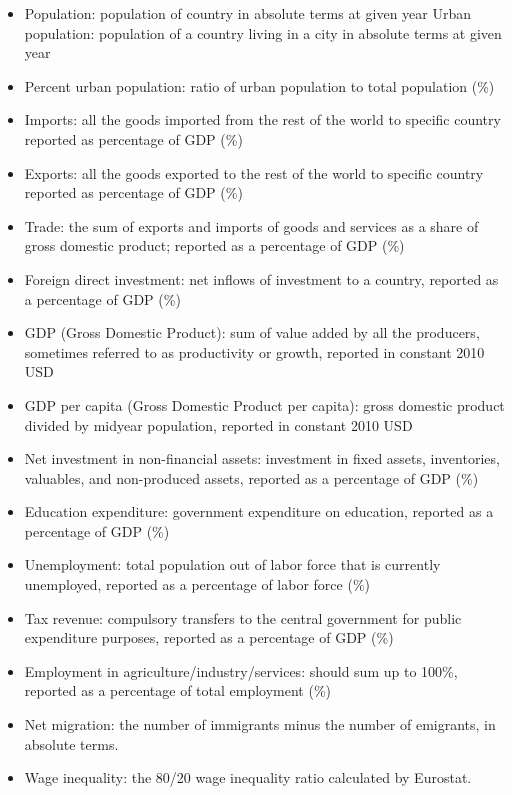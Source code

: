 \documentclass[
]{article}
\begin{document}
\begin{itemize}
\item
  Population: population of country in absolute terms at given year
  Urban population: population of a country living in a city in absolute
  terms at given year
\item
  Percent urban population: ratio of urban population to total
  population (\%)
\item
  Imports: all the goods imported from the rest of the world to specific
  country reported as percentage of GDP (\%)
\item
  Exports: all the goods exported to the rest of the world to specific
  country reported as percentage of GDP (\%)
\item
  Trade: the sum of exports and imports of goods and services as a share
  of gross domestic product; reported as a percentage of GDP (\%)
\item
  Foreign direct investment: net inflows of investment to a country,
  reported as a percentage of GDP (\%)
\item
  GDP (Gross Domestic Product): sum of value added by all the producers,
  sometimes referred to as productivity or growth, reported in constant
  2010 USD
\item
  GDP per capita (Gross Domestic Product per capita): gross domestic
  product divided by midyear population, reported in constant 2010 USD
\item
  Net investment in non-financial assets: investment in fixed assets,
  inventories, valuables, and non-produced assets, reported as a
  percentage of GDP (\%)
\item
  Education expenditure: government expenditure on education, reported
  as a percentage of GDP (\%)
\item
  Unemployment: total population out of labor force that is currently
  unemployed, reported as a percentage of labor force (\%)
\item
  Tax revenue: compulsory transfers to the central government for public
  expenditure purposes, reported as a percentage of GDP (\%)
\item
  Employment in agriculture/industry/services: should sum up to 100\%,
  reported as a percentage of total employment (\%)
\item
  Net migration: the number of immigrants minus the number of emigrants,
  in absolute terms.
\item
  Wage inequality: the 80/20 wage inequality ratio calculated by
  Eurostat.
\end{itemize}
\end{document}
